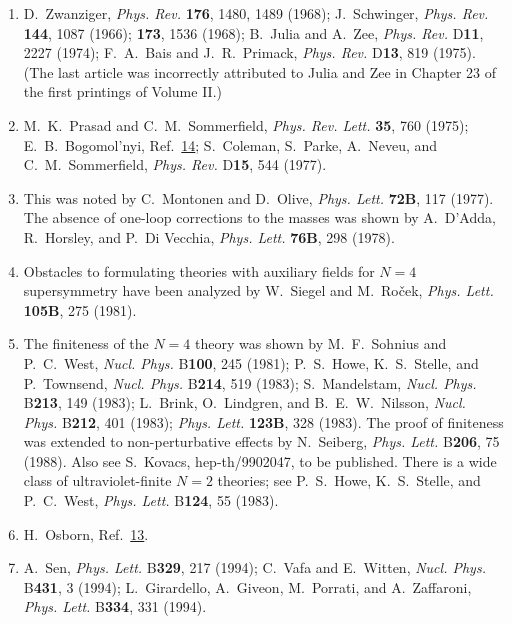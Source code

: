 \begin{enumerate}
  \item {}\label{ch27-ref-15}
  D.~Zwanziger, \textit{Phys. Rev.} \textbf{176}, 1480, 1489 (1968);
  J.~Schwinger, \textit{Phys. Rev.} \textbf{144}, 1087 (1966);
  \textbf{173}, 1536 (1968); B.~Julia and A.~Zee,
  \textit{Phys. Rev.} D\textbf{11}, 2227 (1974); F.~A.~Bais and
  J.~R.~Primack, \textit{Phys. Rev.} D\textbf{13}, 819 (1975). (The
  last article was incorrectly attributed to Julia and Zee in Chapter
  23 of the first printings of Volume II.)

  \item {}\label{ch27-ref-16}
  M.~K.~Prasad and C.~M.~Sommerfield, \textit{Phys. Rev. Lett.}
  \textbf{35}, 760 (1975); E.~B.~Bogomol'nyi,
  Ref.~\hyperref[ch27-ref-14]{14}; S.~Coleman, S.~Parke, A.~Neveu, and
  C.~M.~Sommerfield, \textit{Phys. Rev.} D\textbf{15}, 544 (1977).

  \item {}\label{ch27-ref-17}
  This was noted by C.~Montonen and D.~Olive, \textit{Phys. Lett.}
  \textbf{72B}, 117 (1977). The absence of one-loop corrections to the
  masses was shown by A.~D'Adda, R.~Horsley, and P.~Di Vecchia,
  \textit{Phys. Lett.} \textbf{76B}, 298 (1978).

  \item {}\label{ch27-ref-18}
  Obstacles to formulating theories with auxiliary fields for $N=4$
  supersymmetry have been analyzed by W.~Siegel and M.~Ro\v{c}ek,
  \textit{Phys. Lett.} \textbf{105B}, 275 (1981).

  \item {}\label{ch27-ref-19}
  The finiteness of the $N=4$ theory was shown by M.~F.~Sohnius and
  P.~C.~West, \textit{Nucl. Phys.} B\textbf{100}, 245 (1981);
  P.~S.~Howe, K.~S.~Stelle, and P.~Townsend, \textit{Nucl. Phys.}
  B\textbf{214}, 519 (1983); S.~Mandelstam, \textit{Nucl. Phys.}
  B\textbf{213}, 149 (1983); L.~Brink, O.~Lindgren, and
  B.~E.~W.~Nilsson, \textit{Nucl. Phys.} B\textbf{212}, 401 (1983);
  \textit{Phys. Lett.} \textbf{123B}, 328 (1983). The proof of
  finiteness was extended to non-perturbative effects by N.~Seiberg,
  \textit{Phys. Lett.} B\textbf{206}, 75 (1988). Also see S.~Kovacs,
  hep-th/9902047, to be published. There is a wide class of
  ultraviolet-finite $N=2$ theories; see P.~S.~Howe, K.~S.~Stelle, and
  P.~C.~West, \textit{Phys. Lett.} B\textbf{124}, 55 (1983).

  \item {}\label{ch27-ref-20}
  H.~Osborn, Ref.~\hyperref[ch27-ref-13]{13}.

  \item {}\label{ch27-ref-21}
  A.~Sen, \textit{Phys. Lett.} B\textbf{329}, 217 (1994); C.~Vafa and
  E.~Witten, \textit{Nucl. Phys.} B\textbf{431}, 3 (1994);
  L.~Girardello, A.~Giveon, M.~Porrati, and A.~Zaffaroni,
  \textit{Phys. Lett.} B\textbf{334}, 331 (1994).
\end{enumerate}
